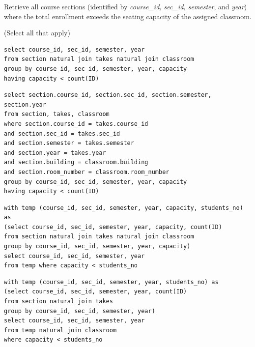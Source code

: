 \documentclass[12pt, addpoints, answers]{exam}
\begin{document}
\begin{questions}
\begin{minipage}{\linewidth}
\question[8]
Retrieve all course sections (identified by \textit{course\_id, sec\_id, semester}, and \textit{year}) 
where the total enrollment exceeds the seating capacity of the assigned classroom.\par\vspace{0.5em}
(Select all that apply)\par\vspace{0.5em}
\begin{checkboxes} 
    \CorrectChoice \begin{verbatim}
select course_id, sec_id, semester, year
from section natural join takes natural join classroom
group by course_id, sec_id, semester, year, capacity
having capacity < count(ID)
    \end{verbatim}
    \CorrectChoice \begin{verbatim}
select section.course_id, section.sec_id, section.semester, section.year
from section, takes, classroom
where section.course_id = takes.course_id
and section.sec_id = takes.sec_id
and section.semester = takes.semester
and section.year = takes.year
and section.building = classroom.building
and section.room_number = classroom.room_number
group by course_id, sec_id, semester, year, capacity
having capacity < count(ID)
    \end{verbatim}
    \CorrectChoice \begin{verbatim}
with temp (course_id, sec_id, semester, year, capacity, students_no) as
(select course_id, sec_id, semester, year, capacity, count(ID)
from section natural join takes natural join classroom
group by course_id, sec_id, semester, year, capacity)
select course_id, sec_id, semester, year
from temp where capacity < students_no
    \end{verbatim}
    \choice \begin{verbatim}
with temp (course_id, sec_id, semester, year, students_no) as
(select course_id, sec_id, semester, year, count(ID)
from section natural join takes
group by course_id, sec_id, semester, year)
select course_id, sec_id, semester, year
from temp natural join classroom
where capacity < students_no
    \end{verbatim}
\end{checkboxes}
\end{minipage}\vspace{1em}


\end{questions}
\end{document}
